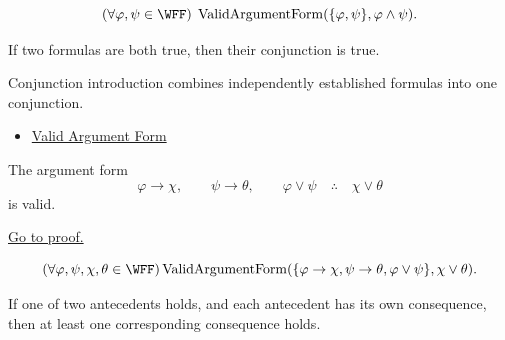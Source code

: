\begin{remark*}
\[
(\forall\varphi,\psi\in\WFF)\;\operatorname{ValidArgumentForm}(\{\varphi,\psi\},\varphi\land\psi).
\]
\end{remark*}

\begin{remark*}
If two formulas are both true, then their conjunction is true.
\end{remark*}

\begin{remark*}[Interpretation]
Conjunction introduction combines independently established formulas into one conjunction.
\end{remark*}

\begin{dependencies}
\begin{itemize}
  \item \hyperref[def:valid-argument-form-propositional-logic]{Valid Argument Form}
\end{itemize}
\end{dependencies}

\begin{tcolorbox}[colback=thmbox, colframe=thmborder, arc=2pt,
  left=6pt, right=6pt, top=4pt, bottom=4pt,
  title={\small\textbf{Theorem (Constructive Dilemma is Valid)}},
  fonttitle=\small\bfseries]
\begin{theorem}
\label{thm:constructive-dilemma-validity-propositional-logic}
The argument form
\[
\varphi\to\chi,\qquad \psi\to\theta,\qquad \varphi\lor\psi
\quad\therefore\quad
\chi\lor\theta
\]
is valid.

\noindent\hyperref[prf:constructive-dilemma-validity-propositional-logic]{Go to proof.}
\end{theorem}
\end{tcolorbox}

\begin{remark*}
\[
(\forall\varphi,\psi,\chi,\theta\in\WFF)
\operatorname{ValidArgumentForm}(\{\varphi\to\chi,\psi\to\theta,\varphi\lor\psi\},\chi\lor\theta).
\]
\end{remark*}

\begin{remark*}
If one of two antecedents holds, and each antecedent has its own consequence,
then at least one corresponding consequence holds.
\end{remark*}

